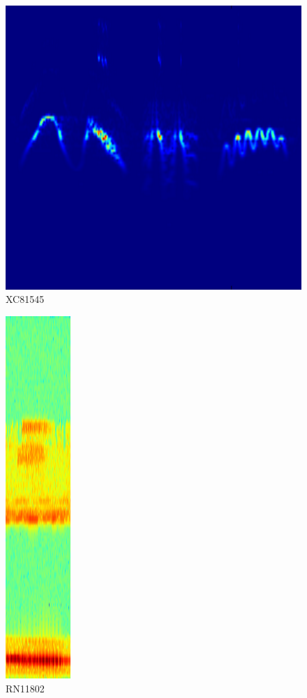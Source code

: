 \documentclass[a4paper]{article}
\begin{document}
\begin{figure}[H]
\begin{center}
\includegraphics[scale=0.2]{XC81545_feature.png}\caption{XC81545}\label{figure8}
\end{center}
\end{figure}

\begin{figure}[H]
\begin{center}
\includegraphics[scale=0.2]{RN11802_feature.png}
\caption{RN11802}\label{figure9}
\end{center}
\end{figure}
\end{document}
